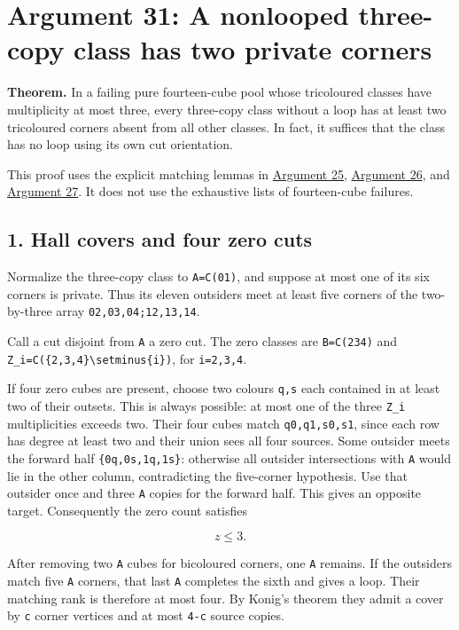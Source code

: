 \documentclass[
  10pt,
]{article}
\begin{document}
\hypertarget{arg-31}{%
\section{Argument 31: A nonlooped three-copy class has two private
corners}\label{arg-31}}

\textbf{Theorem.} In a failing pure fourteen-cube pool whose tricoloured
classes have multiplicity at most three, every three-copy class without
a loop has at least two tricoloured corners absent from all other
classes. In fact, it suffices that the class has no loop using its own
cut orientation.

This proof uses the explicit matching lemmas in
\protect\hyperlink{arg-25}{Argument 25},
\protect\hyperlink{arg-26}{Argument 26}, and
\protect\hyperlink{arg-27}{Argument 27}. It does not use the exhaustive
lists of fourteen-cube failures.

\hypertarget{hall-covers-and-four-zero-cuts}{%
\subsection*{1. Hall covers and four zero
cuts}\label{hall-covers-and-four-zero-cuts}}

Normalize the three-copy class to \texttt{A=C(01)}, and suppose at most
one of its six corners is private. Thus its eleven outsiders meet at
least five corners of the two-by-three array \texttt{02,03,04;12,13,14}.

Call a cut disjoint from \texttt{A} a zero cut. The zero classes are
\texttt{B=C(234)} and
\texttt{Z\_i=C(\{2,3,4\}\textbackslash{}setminus\{i\})}, for
\texttt{i=2,3,4}.

If four zero cubes are present, choose two colours \texttt{q,s} each
contained in at least two of their outsets. This is always possible: at
most one of the three \texttt{Z\_i} multiplicities exceeds two. Their
four cubes match \texttt{q0,q1,s0,s1}, since each row has degree at
least two and their union sees all four sources. Some outsider meets the
forward half \texttt{\{0q,0s,1q,1s\}}: otherwise all outsider
intersections with \texttt{A} would lie in the other column,
contradicting the five-corner hypothesis. Use that outsider once and
three \texttt{A} copies for the forward half. This gives an opposite
target. Consequently the zero count satisfies

\[
z\le3.
\]

After removing two \texttt{A} cubes for bicoloured corners, one
\texttt{A} remains. If the outsiders match five \texttt{A} corners, that
last \texttt{A} completes the sixth and gives a loop. Their matching
rank is therefore at most four. By Konig's theorem they admit a cover by
\texttt{c} corner vertices and at most \texttt{4-c} source copies.
\end{document}
